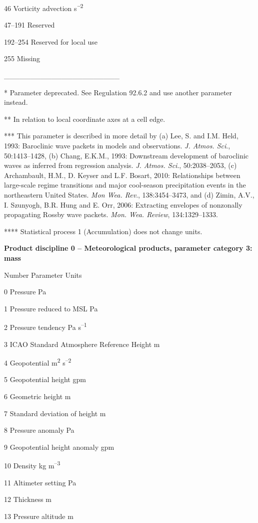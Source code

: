 46 Vorticity advection s\textsuperscript{\emph{\textbf{--}}2}

47--191 Reserved

192--254 Reserved for local use

255 Missing

\_\_\_\_\_\_\_\_\_\_\_\_\_\_\_\_\_\_\_\_\_\_

* Parameter deprecated. See Regulation 92.6.2 and use another parameter instead.

** In relation to local coordinate axes at a cell edge.

*** This parameter is described in more detail by (a) Lee, S. and I.M. Held, 1993: Baroclinic wave packets in models and observations. \emph{J. Atmos. Sci}., 50:1413--1428, (b) Chang, E.K.M., 1993: Downstream development of baroclinic waves as inferred from regression analysis. \emph{J. Atmos. Sci}., 50:2038--2053, (c) Archambault, H.M., D. Keyser and L.F. Bosart, 2010: Relationships between large-scale regime transitions and major cool-season precipitation events in the northeastern United States. \emph{Mon Wea. Rev}., 138:3454--3473, and (d) Zimin, A.V., I. Szunyogh, B.R. Hung and E. Orr, 2006: Extracting envelopes of nonzonally propagating Rossby wave packets. \emph{Mon. Wea. Review}, 134:1329--1333.

**** Statistical process 1 (Accumulation) does not change units.

\textbf{Product discipline 0 -- Meteorological products, parameter category 3: mass}

Number Parameter Units

0 Pressure Pa

1 Pressure reduced to MSL Pa

2 Pressure tendency Pa s\textsuperscript{--1}

3 ICAO Standard Atmosphere Reference Height m

4 Geopotential m\textsuperscript{2} s\textsuperscript{--2}

5 Geopotential height gpm

6 Geometric height m

7 Standard deviation of height m

8 Pressure anomaly Pa

9 Geopotential height anomaly gpm

10 Density kg m\textsuperscript{--3}

11 Altimeter setting Pa

12 Thickness m

13 Pressure altitude m

